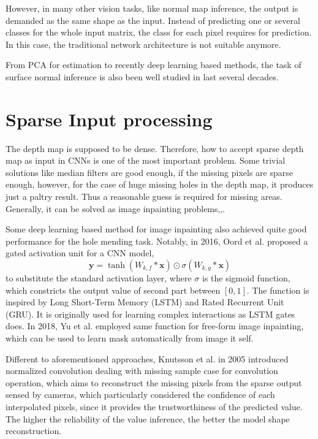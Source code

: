 However, in many other vision tasks, like normal map inference, the output is demanded as the same shape as the input. Instead of predicting one or several classes for the whole input matrix, the class for each pixel requires for prediction. In this case, the traditional network architecture is not suitable anymore.



From PCA for estimation to recently deep learning based methods, the task of surface normal inference is also been well studied in last several decades. 


\section{Sparse Input processing}

The depth map is supposed to be dense. Therefore, how to accept sparse depth map as input in CNNs is one of the most important problem. Some trivial solutions like median filters are good enough, if the missing pixels are sparse enough, however, for the case of huge missing holes in the depth map, it produces just a paltry result. Thus a reasonable guess is required for missing areas. Generally, it can be solved as image inpainting problems,\cite{inpainting1},\cite{inpainting2}. 

Some deep learning based method for image inpainting also achieved quite good performance for the hole mending task. 
Notably, in 2016, Oord et al. \cite{gated_activation} proposed a gated activation unit for a CNN model,
\[\textbf{y} = \tanh (W_{k,f} * \textbf{x}) \odot \sigma (W_{k,g} * \textbf{x})\]
to substitute the standard activation layer, where $ \sigma $ is the sigmoid function, which constricts the output value of second part between $ [0,1] $.  The function is inspired by Long Short-Term Memory (LSTM) \cite{lstm} and Rated Recurrent Unit (GRU).\cite{gru} It is originally used for learning complex interactions as LSTM gates does. In 2018, Yu et al. \cite{gconv} employed same function for free-form image inpainting, which can be used to learn mask automatically from image it self.

Different to aforementioned approaches, Knutsson et al. in 2005 introduced normalized convolution \cite{nconv} dealing with missing sample case for convolution operation, which aims to reconstruct the missing pixels from the sparse output sensed by cameras, which particularly considered the confidence of each interpolated pixels, since it provides the trustworthiness of the predicted value. The higher the reliability of the value inference, the better the model shape reconstruction.

